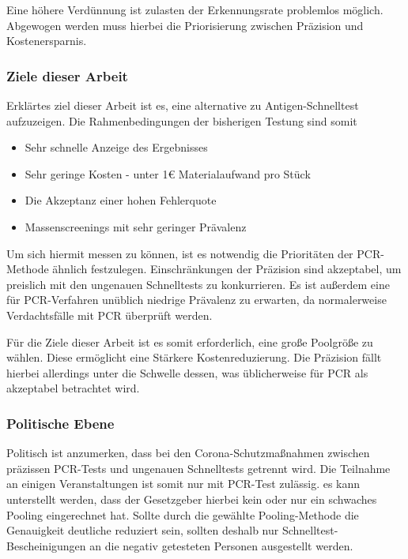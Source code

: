 Eine höhere Verdünnung ist zulasten der Erkennungsrate problemlos möglich.
Abgewogen werden muss hierbei die Priorisierung zwischen Präzision und Kostenersparnis.

\subsubsection{Ziele dieser Arbeit}
Erklärtes ziel dieser Arbeit ist es, eine alternative zu Antigen-Schnelltest aufzuzeigen.
Die Rahmenbedingungen der bisherigen Testung sind somit
\begin{itemize}
	\item Sehr schnelle Anzeige des Ergebnisses
	\item Sehr geringe Kosten - unter 1€ Materialaufwand pro Stück
	\item Die Akzeptanz einer hohen Fehlerquote
	\item Massenscreenings mit sehr geringer Prävalenz
\end{itemize}
	
Um sich hiermit messen zu können, ist es notwendig die Prioritäten der PCR-Methode ähnlich festzulegen.
Einschränkungen der Präzision sind akzeptabel, um preislich mit den ungenauen Schnelltests zu konkurrieren.
Es ist außerdem eine für PCR-Verfahren unüblich niedrige Prävalenz zu erwarten, da normalerweise Verdachtsfälle mit PCR überprüft werden.

Für die Ziele dieser Arbeit ist es somit erforderlich, eine große Poolgröße zu wählen.
Diese ermöglicht eine Stärkere Kostenreduzierung.
Die Präzision fällt hierbei allerdings unter die Schwelle dessen, was üblicherweise für PCR als akzeptabel betrachtet wird.

\subsubsection{Politische Ebene}
Politisch ist anzumerken, dass bei den Corona-Schutzmaßnahmen zwischen präzissen PCR-Tests und ungenauen Schnelltests getrennt wird.
Die Teilnahme an einigen Veranstaltungen ist somit nur mit PCR-Test zulässig.
es kann unterstellt werden, dass der Gesetzgeber hierbei kein oder nur ein schwaches Pooling eingerechnet hat.
Sollte durch die gewählte Pooling-Methode die Genauigkeit deutliche reduziert sein, sollten deshalb nur Schnelltest-Bescheinigungen an die negativ getesteten Personen ausgestellt werden.

